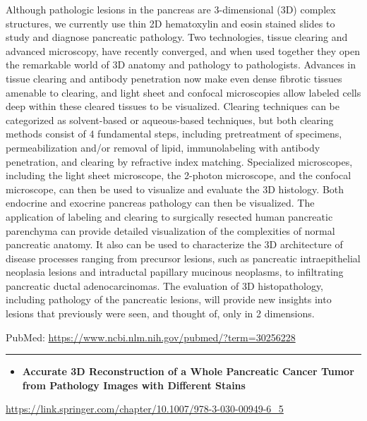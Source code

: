\documentclass[]{article}
\providecommand{\tightlist}{%
  \setlength{\itemsep}{0pt}\setlength{\parskip}{0pt}}
\begin{document}
Although pathologic lesions in the pancreas are 3-dimensional (3D)
complex structures, we currently use thin 2D hematoxylin and eosin
stained slides to study and diagnose pancreatic pathology. Two
technologies, tissue clearing and advanced microscopy, have recently
converged, and when used together they open the remarkable world of 3D
anatomy and pathology to pathologists. Advances in tissue clearing and
antibody penetration now make even dense fibrotic tissues amenable to
clearing, and light sheet and confocal microscopies allow labeled cells
deep within these cleared tissues to be visualized. Clearing techniques
can be categorized as solvent-based or aqueous-based techniques, but
both clearing methods consist of 4 fundamental steps, including
pretreatment of specimens, permeabilization and/or removal of lipid,
immunolabeling with antibody penetration, and clearing by refractive
index matching. Specialized microscopes, including the light sheet
microscope, the 2-photon microscope, and the confocal microscope, can
then be used to visualize and evaluate the 3D histology. Both endocrine
and exocrine pancreas pathology can then be visualized. The application
of labeling and clearing to surgically resected human pancreatic
parenchyma can provide detailed visualization of the complexities of
normal pancreatic anatomy. It also can be used to characterize the 3D
architecture of disease processes ranging from precursor lesions, such
as pancreatic intraepithelial neoplasia lesions and intraductal
papillary mucinous neoplasms, to infiltrating pancreatic ductal
adenocarcinomas. The evaluation of 3D histopathology, including
pathology of the pancreatic lesions, will provide new insights into
lesions that previously were seen, and thought of, only in 2 dimensions.

PubMed: \url{https://www.ncbi.nlm.nih.gov/pubmed/?term=30256228}

{}

{}

\begin{center}\rule{0.5\linewidth}{\linethickness}\end{center}

\begin{itemize}
\tightlist
\item
  \textbf{Accurate 3D Reconstruction of a Whole Pancreatic Cancer Tumor
  from Pathology Images with Different Stains}
\end{itemize}

\url{https://link.springer.com/chapter/10.1007/978-3-030-00949-6_5}
\end{document}
